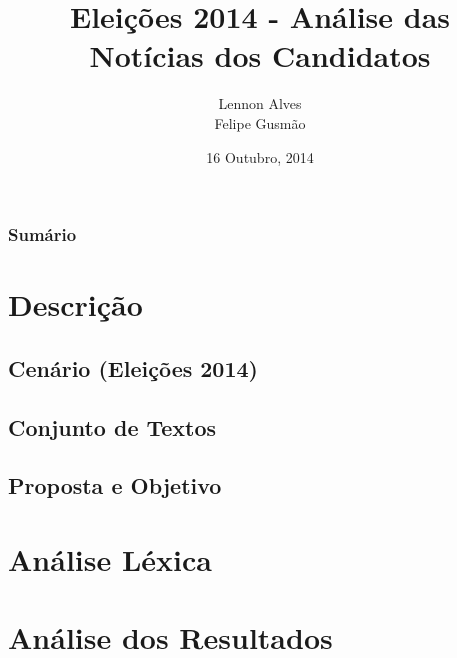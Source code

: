 %

\usepackage[utf8]{inputenc}


\title[Atividade Extra 02]{Eleições 2014 - Análise das Notícias dos Candidatos}

\author{Lennon Alves \\ Felipe Gusmão}
\date{16 Outubro, 2014}



\begin{frame}
\titlepage
\end{frame}



\begin{frame}
\frametitle{Sumário}
\tableofcontents

\section{Descrição}
\subsection{Cenário (Eleições 2014)}
\subsection{Conjunto de Textos}
\subsection{Proposta e Objetivo}
\section{Análise Léxica}
\section{Análise dos Resultados}

\end{frame}


